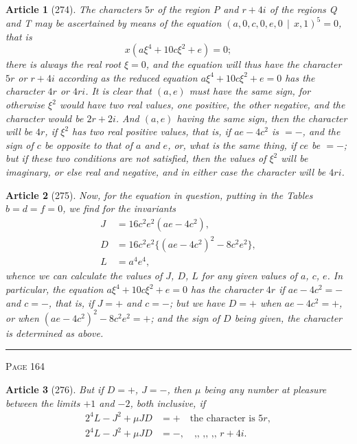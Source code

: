\documentclass[11pt,a4paper]{article}
\theoremstyle{cayley}
\newtheorem{art}{Article}
\begin{document}
\begin{art}[274]
The characters $5r$ of the region P and $r+4i$ of the regions Q and T may be ascertained by means of the equation $(a, 0, c, 0, e, 0 \,\mid\, x, 1)^5 = 0$, that is
\[
x(a\xi^4 + 10c\xi^2 + e) = 0;
\]
there is always the real root $\xi=0$, and the equation will thus have the character $5r$ or $r+4i$ according as the reduced equation $a\xi^4 + 10c\xi^2 + e = 0$ has the character $4r$ or $4ri$. It is clear that $(a, e)$ must have the same sign, for otherwise $\xi^2$ would have two real values, one positive, the other negative, and the character would be $2r+2i$. And $(a, e)$ having the same sign, then the character will be $4r$, if $\xi^2$ has two real positive values, that is, if $ae - 4c^2$ is $=-$, and the sign of $c$ be opposite to that of $a$ and $e$, or, what is the same thing, if $ce$ be $=-$; but if these two conditions are not satisfied, then the values of $\xi^2$ will be imaginary, or else real and negative, and in either case the character will be $4ri$.
\end{art}

\begin{art}[275]
Now, for the equation in question, putting in the Tables $b=d=f=0$, we find for the invariants
\begin{align*}
J &= 16c^2e^2(ae - 4c^2), \\
D &= 16c^2e^2\{(ae-4c^2)^2 - 8c^2e^2\}, \\
L &= a^4e^4,
\end{align*}
whence we can calculate the values of $J$, $D$, $L$ for any given values of $a$, $c$, $e$. In particular, the equation $a\xi^4 + 10c\xi^2 + e = 0$ has the character $4r$ if $ae - 4c^2 = -$ and $c = -$, that is, if $J = +$ and $c = -$; but we have $D = +$ when $ae - 4c^2 = +$, or when $(ae - 4c^2)^2 - 8c^2e^2 = +$; and the sign of $D$ being given, the character is determined as above.
\end{art}

\vspace{1em}
\noindent\rule{\textwidth}{0.4pt}
\begin{center}\textsc{Page 164}\end{center}
\newpage

\begin{art}[276]
But if $D=+$, $J=-$, then $\mu$ being any number at pleasure between the limits $+1$ and $-2$, both inclusive, if
\begin{align*}
2^4L - J^2 + \mu JD &= + \quad\text{the character is } 5r, \\
2^4L - J^2 + \mu JD &= -, \quad\text{,, ,, ,, } r+4i.
\end{align*}
\end{art}
\end{document}
